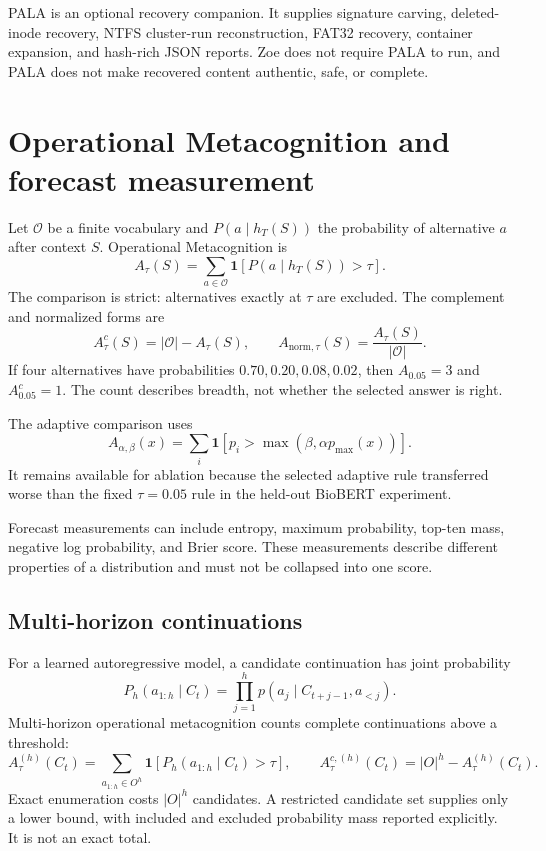 \documentclass[11pt,a4paper]{article}
\begin{document}
PALA is an optional recovery companion. It supplies signature carving, deleted-inode recovery, NTFS cluster-run reconstruction, FAT32 recovery, container expansion, and hash-rich JSON reports. Zoe does not require PALA to run, and PALA does not make recovered content authentic, safe, or complete.

\section{Operational Metacognition and forecast measurement}
Let $\mathcal O$ be a finite vocabulary and $P(a\mid h_T(S))$ the probability of alternative $a$ after context $S$. Operational Metacognition is
\begin{equation}
A_\tau(S)=\sum_{a\in\mathcal O}\mathbf 1[P(a\mid h_T(S))>\tau].
\label{eq:av}
\end{equation}
The comparison is strict: alternatives exactly at $\tau$ are excluded. The complement and normalized forms are
\begin{equation}
A^c_\tau(S)=|\mathcal O|-A_\tau(S),\qquad
A_{\mathrm{norm},\tau}(S)=\frac{A_\tau(S)}{|\mathcal O|}.
\end{equation}
If four alternatives have probabilities $0.70,0.20,0.08,0.02$, then $A_{0.05}=3$ and $A^c_{0.05}=1$. The count describes breadth, not whether the selected answer is right.

The adaptive comparison uses
\begin{equation}
A_{\alpha,\beta}(x)=\sum_i\mathbf 1[p_i>\max(\beta,\alpha p_{\max}(x))].
\end{equation}
It remains available for ablation because the selected adaptive rule transferred worse than the fixed $\tau=0.05$ rule in the held-out BioBERT experiment.

Forecast measurements can include entropy, maximum probability, top-ten mass, negative log probability, and Brier score. These measurements describe different properties of a distribution and must not be collapsed into one score.

\subsection{Multi-horizon continuations}
For a learned autoregressive model, a candidate continuation has joint probability
\begin{equation}
P_h(a_{1:h}\mid C_t)=\prod_{j=1}^{h}p(a_j\mid C_{t+j-1},a_{<j}).
\end{equation}
Multi-horizon operational metacognition counts complete continuations above a threshold:
\begin{equation}
A^{(h)}_\tau(C_t)=\sum_{a_{1:h}\in O^h}\mathbf 1[P_h(a_{1:h}\mid C_t)>\tau],
\qquad
A^{c,(h)}_\tau(C_t)=|O|^h-A^{(h)}_\tau(C_t).
\end{equation}
Exact enumeration costs $|O|^h$ candidates. A restricted candidate set supplies only a lower bound, with included and excluded probability mass reported explicitly. It is not an exact total.
\end{document}
